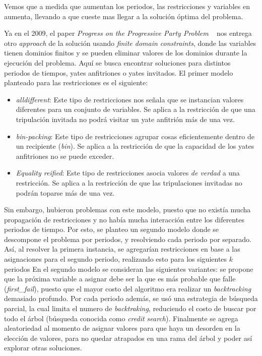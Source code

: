 \documentclass[letter, 10pt]{article}
\begin{document}
Vemos que a medida que aumentan los periodos, las restricciones y variables en aumenta, llevando a que cueste mas llegar a la solución óptima del problema.

Ya en el 2009, el paper \textit{Progress on the Progressive Party Problem} ~\cite{Simonis2009} nos entrega otro \textit{approach} de la solución usando \textit{finite domain constraints}, donde las variables tienen dominios finitos y se pueden eliminar
valores de los dominios durante la ejecución del problema. Aquí se busca encontrar soluciones para distintos periodos de tiempos, yates anfitriones o yates invitados. El primer modelo planteado para las restricciones es el siguiente:

\begin{itemize}
    \item \textit{alldifferent}: Este tipo de restricciones nos señala que se instancian valores diferentes para un conjunto de variables. Se aplica a la restricción de que una tripulación invitada no podrá visitar un yate anfitrión más de una vez.
    \item \textit{bin-packing}: Este tipo de restricciones agrupar cosas eficientemente dentro de un recipiente (\textit{bin}). Se aplica a la restricción de que la capacidad de los yates anfitriones no se puede exceder.
    \item \textit{Equality reified}: Este tipo de restricciones asocia valores \textit{de verdad} a una restricción. Se aplica a la restricción de que las tripulaciones invitadas no podrán toparse más de una vez.
\end{itemize}
Sin embargo, hubieron problemas con este modelo, puesto que no existía mucha propagación de restricciones y no había mucha interacción entre los diferentes periodos de tiempo. Por esto, se planteo un segundo modelo donde se descompone el problema por periodos, y resolviendo cada periodo por separado. Así, al resolver la primera instancia, se agregarían restricciones en base a las asignaciones para el segundo periodo, realizando esto para los siguientes $k$ periodos En el segundo modelo se consideran las siguientes variantes: se propone que la próxima variable a asignar debe ser la que es más probable que falle (\textit{first\_fail}), puesto que el mayor costo del algoritmo era realizar un \textit{backtracking} demasiado profundo. Por cada periodo además, se usó una estrategia de búsqueda parcial, la cual limita el numero de \textit{backtraking}, reduciendo el costo de buscar por todo el árbol (búsqueda conocida como \textit{credit search}). Finalmente se agrega aleatoriedad al momento de asignar valores para que haya un desorden en la elección de valores, para no quedar atrapados en una rama del árbol y poder así explorar otras soluciones.
\end{document}
